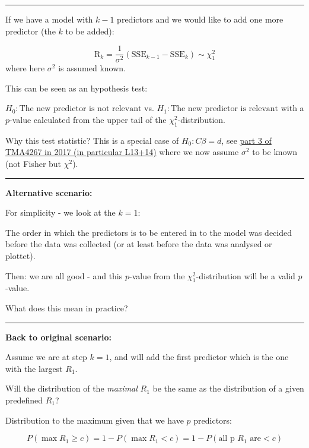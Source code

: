\documentclass[
  letterpaper,
  DIV=11,
  numbers=noendperiod]{scrartcl}
\begin{document}
\begin{center}\rule{0.5\linewidth}{0.5pt}\end{center}

If we have a model with \(k-1\) predictors and we would like to add one
more predictor (the \(k\) to be added):

\[ \text{R}_k=\frac{1}{\sigma^2}(\text{SSE}_{k-1}-\text{SSE}_{k})\sim \chi^2_1\]
where here \(\sigma^2\) is assumed known.

This can be seen as an hypothesis test:

\(H_0: \text{The new predictor is not relevant}\) vs.
\(H_1: \text{The new predictor is relevant}\) with a \(p\)-value
calculated from the upper tail of the \(\chi^2_1\)-distribution.

Why this test statistic? This is a special case of \(H_0: C\beta=d\),
see
\href{https://www.math.ntnu.no/emner/TMA4267/2017v/TMA4267V2017Part3.pdf}{part
3 of TMA4267 in 2017 (in particular L13+14)} where we now assume
\(\sigma^2\) to be known (not Fisher but \(\chi^2\)).

\begin{center}\rule{0.5\linewidth}{0.5pt}\end{center}

\textbf{Alternative scenario:}

For simplicity - we look at the \(k=1\):

The order in which the predictors is to be entered in to the model was
decided before the data was collected (or at least before the data was
analysed or plottet).

Then: we are all good - and this \(p\)-value from the
\(\chi^2_1\)-distribution will be a valid \(p\)-value.

What does this mean in practice?

\begin{center}\rule{0.5\linewidth}{0.5pt}\end{center}

\textbf{Back to original scenario:}

Assume we are at step \(k=1\), and will add the first predictor which is
the one with the largest \(R_1\).

Will the distribution of the \emph{maximal} \(R_1\) be the same as the
distribution of a given predefined \(R_1\)?

Distribution to the maximum given that we have \(p\) predictors:

\[ P(\max R_1 \ge c)=1-P(\max R_1 < c)=1-P(\text{all p } R_1 \text{ are} <c)\]
\end{document}
